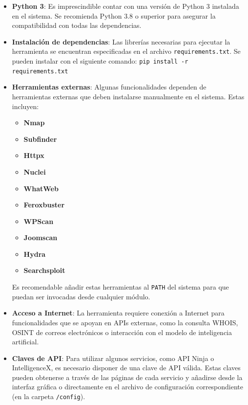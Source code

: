 \begin{parskipenv}
\begin{itemize}
  \item \textbf{Python 3}: Es imprescindible contar con una versión de Python 3 instalada en el sistema. Se recomienda Python 3.8 o superior para asegurar la compatibilidad con todas las dependencias.

  \item \textbf{Instalación de dependencias}: Las librerías necesarias para ejecutar la herramienta se encuentran especificadas en el archivo \texttt{requirements.txt}. Se pueden instalar con el siguiente comando: \texttt{pip install -r requirements.txt}

  \item \textbf{Herramientas externas}: Algunas funcionalidades dependen de herramientas externas que deben instalarse manualmente en el sistema. Estas incluyen:

  \begin{itemize}
    \item \textbf{Nmap}
    \item \textbf{Subfinder}
    \item \textbf{Httpx}
    \item \textbf{Nuclei}
    \item \textbf{WhatWeb}
    \item \textbf{Feroxbuster}
    \item \textbf{WPScan}
    \item \textbf{Joomscan}
    \item \textbf{Hydra}
    \item \textbf{Searchsploit}
  \end{itemize}

  Es recomendable añadir estas herramientas al \texttt{PATH} del sistema para que puedan ser invocadas desde cualquier módulo.

  \item \textbf{Acceso a Internet}: La herramienta requiere conexión a Internet para funcionalidades que se apoyan en APIs externas, como la consulta WHOIS, OSINT de correos electrónicos o interacción con el modelo de inteligencia artificial.

  \item \textbf{Claves de API}: Para utilizar algunos servicios, como API Ninja o IntelligenceX, es necesario disponer de una clave de API válida. Estas claves pueden obtenerse a través de las páginas de cada servicio y añadirse desde la interfaz gráfica o directamente en el archivo de configuración correspondiente (en la carpeta \texttt{/config}).
\end{itemize}


\end{parskipenv}
